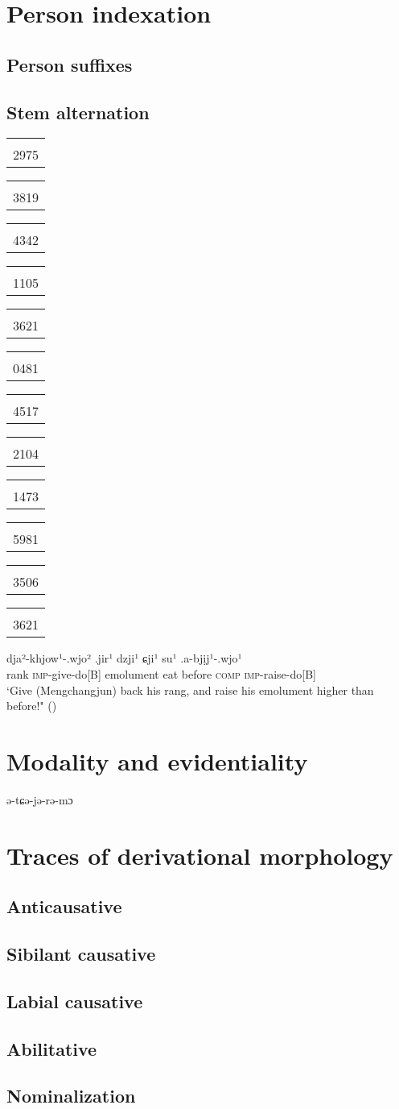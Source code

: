 \documentclass[oneside,a4paper,11pt]{article}
\newcommand{\ipa}[1]{{\phon#1}} %
\newcommand{\tgf}[1]{\begin{tabular}{l}\mo{#1}\\{\tiny #1}\end{tabular}}
\begin{document}
 

 \section{Person indexation}

\subsection{Person suffixes}

\citet{jacques16th}
\subsection{Stem alternation}

\citet{gong01huying}
\citet{jacques09tangutverb}
\citet{gong16stems}


 

\begin{exe}
\ex 
\glt \tgf{2975}	\tgf{3819}	\tgf{4342}	\tgf{1105}	\tgf{3621}	\tgf{0481}	\tgf{4517}	\tgf{2104}	\tgf{1473}	\tgf{5981}	\tgf{3506}	\tgf{3621}
\gll \ipa{tsjiir¹.lu²}	\ipa{dja²-khjow¹-.wjo²}	\ipa{.jir¹}	\ipa{dzji¹}	\ipa{ɕji¹}	\ipa{su¹}	\ipa{.a-bjịj¹-.wjo¹} \\
rank \textsc{imp}-give-do[B] emolument eat before \textsc{comp} \textsc{imp}-raise-do[B] \\
\glt `Give (Mengchangjun) back his rang, and raise his emolument higher than before!" (\citealt[40;189]{solonin95})
\end{exe}

 \section{Modality and evidentiality}
 
 \citet{jacques09tangutverb}
 \ipa{ə-tɕə-jə-rə-mɔ}
 

 \section{Traces of derivational morphology}

\subsection{Anticausative}

\subsection{Sibilant causative}

\subsection{Labial causative}

\subsection{Abilitative}

\subsection{Nominalization}

\phon


\end{document}
